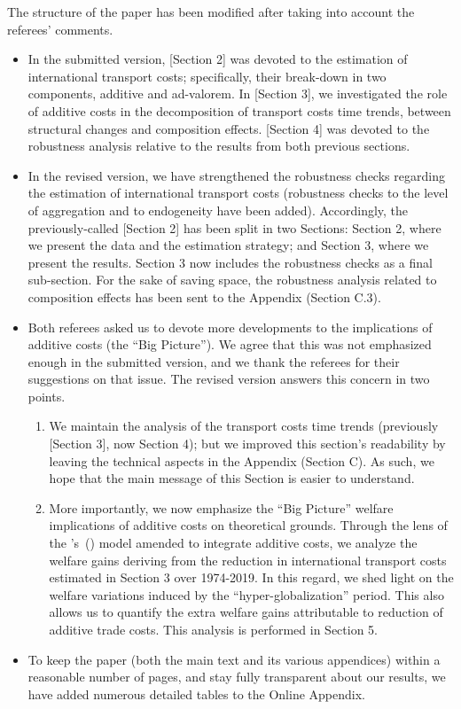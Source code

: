 \documentclass[a4paper,11pt]{article}
\newcommand\cites[1]{\citeauthor{#1}'s\ (\citeyear{#1})}
\begin{document}
The structure of the paper has been modified after taking into account the referees' comments.
\begin{itemize}
\item In the submitted version, [Section 2] was devoted to the estimation of international transport costs; specifically, their break-down in two components, additive and ad-valorem. In [Section 3], we investigated the role of additive costs in the decomposition of transport costs time trends, between structural changes and composition effects. [Section 4] was devoted to the robustness analysis relative to the results from both previous sections.
\item In the revised version, we have strengthened the robustness checks regarding the estimation of international transport costs (robustness checks to the level of aggregation and to endogeneity have been added). Accordingly, the previously-called [Section 2] has been split in two Sections: Section 2, where we present the data and the estimation strategy; and Section 3, where we present the results. Section 3 now includes the robustness checks as a final sub-section. For the sake of saving space, the robustness analysis related to composition effects has been sent to the Appendix (Section C.3).
\item Both referees asked us to devote more developments to the implications of additive costs (the ``Big Picture''). We agree that this was not emphasized enough in the submitted version, and we thank the referees for their suggestions on that issue. The revised version answers this concern in two points.
    \begin{enumerate}
    \item We maintain the analysis of the transport costs time trends (previously [Section 3], now Section 4); but we improved this section's readability by leaving the technical aspects in the Appendix (Section C). As such, we hope that the main message of this Section is easier to understand.
    \item More importantly, we now emphasize the ``Big Picture'' welfare implications of additive costs on theoretical grounds. Through the lens of the \cites{melitz} model amended to integrate additive costs, we analyze the welfare gains deriving from the reduction in international transport costs estimated in Section 3 over 1974-2019. In this regard, we shed light on the welfare variations induced by the ``hyper-globalization'' period. This also allows us to quantify the extra welfare gains attributable to reduction of additive trade costs. This analysis is performed in Section 5.

        \end{enumerate}
\item To keep the paper (both the main text and its various appendices) within a reasonable number of pages, and stay fully transparent about our results, we have added numerous detailed tables to the Online Appendix.
\end{itemize}
\end{document}
